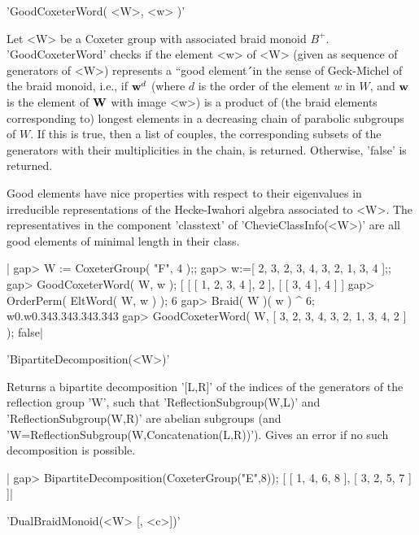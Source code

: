 
'GoodCoxeterWord( <W>, <w> )'

Let   <W>  be  a   Coxeter  group  with   associated  braid  monoid  $B^+$.
'GoodCoxeterWord'  checks if the  element <w> of  <W> (given as sequence of
generators  of  <W>)  represents  a  ``good  element\'\'\  in  the sense of
Geck-Michel \cite{GM97} of the braid monoid, i.e., if ${\bf w}^d$ (where $d$ is
the order of the element $w$ in $W$, and ${\bf w}$ is the element of ${\bf W}$ with
image  <w>) is a  product of (the  braid elements corresponding to) longest
elements  in a decreasing chain  of parabolic subgroups of  $W$. If this is
true,  then a list of couples,  the corresponding subsets of the generators
with  their multiplicities in the chain, is returned. Otherwise, 'false' is
returned.

Good  elements have  nice properties  with respect  to their eigenvalues in
irreducible  represen\-tations of  the Hecke-Iwahori  algebra associated to
<W>. The representatives in the component 'classtext' of
'ChevieClassInfo(<W>)'  are all  good elements  of minimal  length in their
class.

|    gap> W := CoxeterGroup( "F", 4 );;
    gap> w:=[ 2, 3, 2, 3, 4, 3, 2, 1, 3, 4 ];;
    gap> GoodCoxeterWord( W, w );
    [ [ [ 1, 2, 3, 4 ], 2 ], [ [ 3, 4 ], 4 ] ]
    gap> OrderPerm( EltWord( W, w ) );
    6
    gap> Braid( W )( w ) ^ 6;
    w0.w0.343.343.343.343
    gap>  GoodCoxeterWord( W, [ 3, 2, 3, 4, 3, 2, 1, 3, 4, 2 ] );
    false|


'BipartiteDecomposition(<W>)'

Returns  a bipartite decomposition '[L,R]' of the indices of the generators
of  the  reflection  group  'W',  such  that  'ReflectionSubgroup(W,L)' and
'ReflectionSubgroup(W,R)' are abelian subgroups (and
'W=ReflectionSubgroup(W,Concatenation(L,R))').  Gives an  error if  no such
decomposition is possible.

|    gap> BipartiteDecomposition(CoxeterGroup("E",8));
    [ [ 1, 4, 6, 8 ], [ 3, 2, 5, 7 ] ]|


'DualBraidMonoid(<W> [, <c>])'

